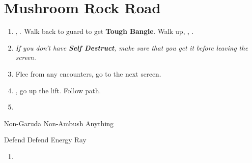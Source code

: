 \chapter{Mushroom Rock Road}

\begin{enumerate}
	\item \sd, \cs. Walk back to guard to get \textbf{Tough Bangle}. Walk up, \sd, \sd.
	\item \textit{If you don't have \textbf{Self Destruct}, make sure that you get it before leaving the screen.}
	\item Flee from any encounters, go to the next screen.
	\item \save, go up the lift. Follow path.
	\item \formation{\tidus}{\wakka}{\auron}
\end{enumerate}
\begin{battle}{Non-Garuda Non-Ambush Anything}
	\begin{itemize}
		\switch{\tidus}{\kimahri}
		\kimahrif Defend
		\wakkaf Defend
		\switch{\auron}{\yuna}
		\summon{\valefor}
		\valeforf Energy Ray
	\end{itemize}
\end{battle}
\begin{enumerate}[resume]
	\item \formation{\tidus}{\wakka}{\auron}
\end{enumerate}
